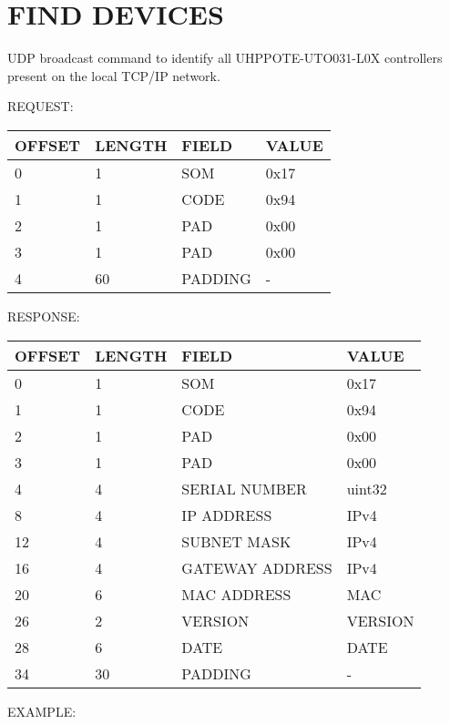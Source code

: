 \documentclass[11pt, oneside]{article}
\begin{document}

\section*{FIND DEVICES}

UDP broadcast command to identify all UHPPOTE-UTO031-L0X controllers present on the local TCP/IP network.

REQUEST:

{ \begin{tabular}{ | l | l | l | l | }
   \hline
   OFFSET & LENGTH & FIELD & VALUE \\ 
   \hline
   0 & 1 & SOM & 0x17 \\ 
   \hline
   1 & 1 & CODE & 0x94 \\ 
   \hline
   2 & 1 & PAD & 0x00 \\ 
   \hline
   3 & 1 & PAD & 0x00 \\ 
   \hline
   4 & 60 & PADDING & - \\ 
   \hline
   \end{tabular}
   \vspace{0.5cm}
}

RESPONSE:

{ \begin{tabular}{ | l | l | l | l | }
   \hline
   OFFSET & LENGTH & FIELD & VALUE \\ 
   \hline
   0 & 1 & SOM & 0x17 \\ 
   \hline
   1 & 1 & CODE & 0x94 \\ 
   \hline
   2 & 1 & PAD & 0x00 \\ 
   \hline
   3 & 1 & PAD & 0x00 \\ 
   \hline
   4 & 4 & SERIAL NUMBER & uint32 \\ 
   \hline
   8 & 4 & IP ADDRESS & IPv4 \\ 
   \hline
   12 & 4 & SUBNET MASK & IPv4 \\ 
   \hline
   16 & 4 & GATEWAY ADDRESS & IPv4 \\ 
   \hline
   20 & 6 & MAC ADDRESS & MAC \\ 
   \hline
   26 & 2 & VERSION & VERSION \\ 
   \hline
   28 & 6 & DATE & DATE \\ 
   \hline
   34 & 30 & PADDING & - \\ 
   \hline
   \end{tabular}
   \vspace{0.5cm}
}

EXAMPLE:
\end{document}
